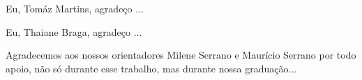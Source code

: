 \begin{agradecimentos}
Eu, Tomáz Martins, agradeço ...

Eu, Thaiane Braga, agradeço ...

Agradecemos aos nossos orientadores Milene Serrano e Maurício Serrano por todo apoio, não só durante esse trabalho, mas durante nossa graduação...
\end{agradecimentos}
